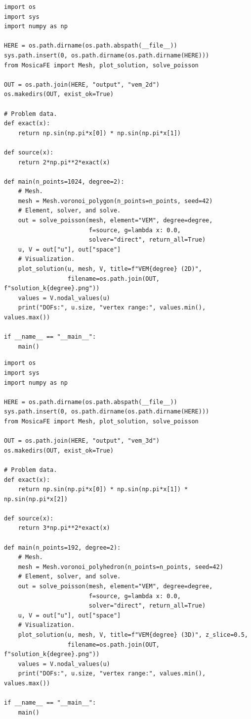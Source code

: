 \documentclass[UTF8,11pt,oneside]{ctexbook}
\theoremstyle{definition}
\theoremstyle{plain}
\begin{document}
\begin{lstlisting}[language=MosicaFE,caption={二维独立主程序}]
import os
import sys
import numpy as np

HERE = os.path.dirname(os.path.abspath(__file__))
sys.path.insert(0, os.path.dirname(os.path.dirname(HERE)))
from MosicaFE import Mesh, plot_solution, solve_poisson

OUT = os.path.join(HERE, "output", "vem_2d")
os.makedirs(OUT, exist_ok=True)

# Problem data.
def exact(x):
    return np.sin(np.pi*x[0]) * np.sin(np.pi*x[1])

def source(x):
    return 2*np.pi**2*exact(x)

def main(n_points=1024, degree=2):
    # Mesh.
    mesh = Mesh.voronoi_polygon(n_points=n_points, seed=42)
    # Element, solver, and solve.
    out = solve_poisson(mesh, element="VEM", degree=degree,
                        f=source, g=lambda x: 0.0,
                        solver="direct", return_all=True)
    u, V = out["u"], out["space"]
    # Visualization.
    plot_solution(u, mesh, V, title=f"VEM{degree} (2D)",
                  filename=os.path.join(OUT, f"solution_k{degree}.png"))
    values = V.nodal_values(u)
    print("DOFs:", u.size, "vertex range:", values.min(), values.max())

if __name__ == "__main__":
    main()
\end{lstlisting}

\begin{lstlisting}[language=MosicaFE,caption={三维独立主程序}]
import os
import sys
import numpy as np

HERE = os.path.dirname(os.path.abspath(__file__))
sys.path.insert(0, os.path.dirname(os.path.dirname(HERE)))
from MosicaFE import Mesh, plot_solution, solve_poisson

OUT = os.path.join(HERE, "output", "vem_3d")
os.makedirs(OUT, exist_ok=True)

# Problem data.
def exact(x):
    return np.sin(np.pi*x[0]) * np.sin(np.pi*x[1]) * np.sin(np.pi*x[2])

def source(x):
    return 3*np.pi**2*exact(x)

def main(n_points=192, degree=2):
    # Mesh.
    mesh = Mesh.voronoi_polyhedron(n_points=n_points, seed=42)
    # Element, solver, and solve.
    out = solve_poisson(mesh, element="VEM", degree=degree,
                        f=source, g=lambda x: 0.0,
                        solver="direct", return_all=True)
    u, V = out["u"], out["space"]
    # Visualization.
    plot_solution(u, mesh, V, title=f"VEM{degree} (3D)", z_slice=0.5,
                  filename=os.path.join(OUT, f"solution_k{degree}.png"))
    values = V.nodal_values(u)
    print("DOFs:", u.size, "vertex range:", values.min(), values.max())

if __name__ == "__main__":
    main()
\end{lstlisting}
\end{document}
